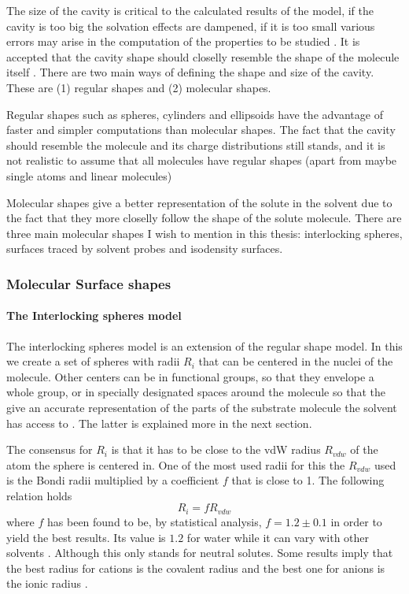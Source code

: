 \documentclass[../master_thesis.tex]{subfiles}
\begin{document}
The size of the cavity is critical to the calculated results of the model, if
the cavity is too big the solvation effects are dampened, if it is too small
various errors may arise in the computation of the properties to be studied
\cite{Tomasi:1994wt}. It is accepted that the cavity shape should closelly
resemble the shape of the molecule itself \cite{Tomasi:2005ipa}. There are two
main ways of defining the shape and size of the cavity. These are (1) regular
shapes and (2) molecular shapes.

Regular shapes such as spheres, cylinders and ellipsoids have the advantage of
faster and simpler computations than molecular shapes. The fact that the cavity
should resemble the molecule and its charge distributions still stands, and it
is not realistic to assume that all molecules have regular shapes (apart from
maybe single atoms and linear molecules) \cite{Tomasi:2005ipa}

Molecular shapes give a better representation of the solute in the solvent due
to the fact that they more closelly follow the shape of the solute molecule.
There are three main molecular shapes I wish to mention in this thesis:
interlocking spheres, surfaces traced by solvent probes and isodensity surfaces.

\subsubsection{Molecular Surface shapes}

\paragraph{The Interlocking spheres model}
The interlocking spheres model is an extension of the regular shape model. In
this we create a set of spheres with radii $R_i$ that can be centered in the
nuclei of the molecule. Other centers can be in functional groups, so that they envelope a whole group,
or in specially designated spaces around the molecule so that the give an accurate
representation of the parts of the substrate molecule the solvent has access to
\cite{Tomasi:1994wt}. The latter is explained more in the next section.

The consensus for $R_i$ is that it has to be close to the \ac{vdW} radius
$R_{vdw}$ of the atom the sphere is centered in. One of the most used radii for
this  the $R_{vdw}$ used is the Bondi radii \cite{doi:10.1021/j100785a001,
Tomasi:2005ipa} multiplied by a coefficient $f$ that is close to 1. The
following relation holds
\cite{Tomasi:1994wt}
\begin{equation}
  R_i = fR_{vdw}
\end{equation}
where $f$ has been found to be, by statistical analysis, $f = 1.2 \pm 0.1$ in order to
yield the best results. Its value is $1.2$ for water while it can vary with
other solvents \cite{Tomasi:1994wt}. Although this only stands for neutral
solutes. Some results imply that the best radius for cations is the covalent
radius and the best one for anions is the ionic radius \cite{Tomasi:1994wt}.
\end{document}
